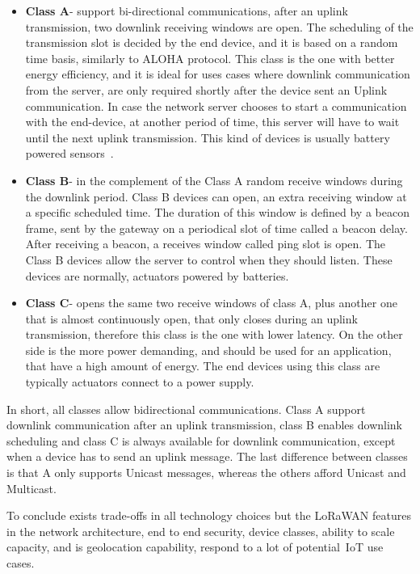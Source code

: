 \begin{itemize}
	\item \textbf{Class A}- support bi-directional communications, after an uplink transmission, two downlink receiving windows are open. The scheduling of the transmission slot is decided by the end device, and it is based on a random time basis, similarly to ALOHA protocol.
	This class is the one with better energy efficiency, and it is ideal for uses cases where downlink communication from the server, are only required shortly after the device sent an Uplink communication.
	In case the network server chooses to start a communication with the end-device, at another period of time, this server will have to wait until the next uplink transmission. This kind of devices is usually battery powered sensors~\cite{Pacheco19}.

	\item\textbf{Class B}- in the complement of the Class A random receive windows during the downlink period. Class B devices can open, an extra receiving window at a specific scheduled time. The duration of this window is defined by a beacon frame, sent by the gateway on a periodical slot of time called a beacon delay. After receiving a beacon, a receives window called ping slot is open. The Class B devices allow the server to control when they should listen. These devices are normally, actuators powered by batteries.
	
	\item \textbf{Class C}- opens the same two receive windows of class A, plus another one that is almost continuously open, that only closes during an uplink transmission, therefore this class is the one with lower latency. On the other side is the more power demanding, and should be used for an application, that have a high amount of energy. The end devices using this class are typically actuators connect to a power supply.

\end{itemize}

In short, all classes allow bidirectional communications. Class A support downlink communication after an uplink transmission, class B enables downlink scheduling and class C is always available for downlink communication, except when a device has to send an uplink message. The last difference between classes is that A only supports Unicast messages, whereas the others afford Unicast and Multicast.

To conclude exists trade-offs in all technology choices but the LoRaWAN features in the network architecture, end to end security, device classes, ability to scale capacity, and is geolocation capability, respond to a lot of  potential~\gls{IoT} use cases.
